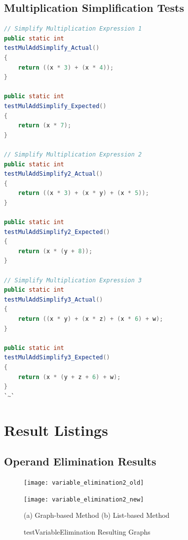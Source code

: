 \documentclass[12pt,openany,a4paper]{book}
\begin{document}
\newpage

\section{Multiplication Simplification Tests}
\label{mulsimplifytests}

\begin{lstlisting}[language=Java, caption=Multiplication Simplification Tests, escapeinside=``]
// Simplify Multiplication Expression 1
public static int
testMulAddSimplify_Actual()
{
    return ((x * 3) + (x * 4));
}

public static int
testMulAddSimplify_Expected()
{
    return (x * 7);
}

// Simplify Multiplication Expression 2
public static int
testMulAddSimplify2_Actual()
{
    return ((x * 3) + (x * y) + (x * 5));
}

public static int
testMulAddSimplify2_Expected()
{
    return (x * (y + 8));
}

// Simplify Multiplication Expression 3
public static int
testMulAddSimplify3_Actual()
{
    return ((x * y) + (x * z) + (x * 6) + w);
}

public static int
testMulAddSimplify3_Expected()
{
    return (x * (y + z + 6) + w);
}
`~`
\end{lstlisting}

\chapter{Result Listings}
\label{appresults}

\section{Operand Elimination Results}
\label{opelimres}

\begin{figure}[H]
    \begin{minipage}[l]{0.4\textwidth}
        \texttt{[image: variable\_elimination2\_old]}
    \end{minipage}
    \hspace{0.05\textwidth}
    \begin{minipage}[l]{0.6\textwidth}
        \texttt{[image: variable\_elimination2\_new]}
    \end{minipage}
    \hspace*{0.03\textwidth}
    (a) Graph-based Method
    \hspace{0.25\textwidth}
    (b) List-based Method
    \caption{testVariableElimination Resulting Graphs}
    \label{varelim}
\end{figure}
\end{document}
